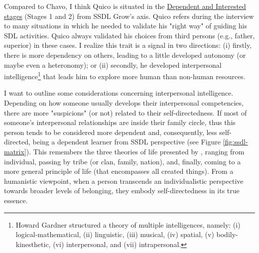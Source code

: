 Compared to Chavo, I think Quico is situated in the \underline{Dependent and Interested stages} (Stages 1 and 2) from \gls{SSDL} Grow's axis. Quico refers during the interview to many situations in which he needed to validate his "right way" of guiding his \gls{SDL} activities. Quico always validated his choices from third persons (e.g., father, superior) in these cases. I realize this trait is a signal in two directions: (i) firstly, there is more dependency on others, leading to a little developed autonomy (or maybe even a heteronomy); or (ii) secondly, he developed interpersonal intelligence\footnote{Howard Gardner \cite[p.~4]{gardner:1989} structured a theory of multiple intelligences, namely: (i) logical-mathematical, (ii) linguistic, (iii) musical, (iv) spatial, (v) bodily-kinesthetic, (vi) interpersonal, and (vii) intrapersonal.} that leads him to explore more human than non-human resources.

I want to outline some considerations concerning interpersonal intelligence. Depending on how someone usually develops their interpersonal competencies, there are more "suspicions" (or not) related to their self-directedness. If most of someone's interpersonal relationships are inside their family circle, thus this person tends to be considered more dependent and, consequently, less self-directed, being a dependent learner from \gls{SSDL} perspective (see Figure \ref{fig:ssdl-matrix}). This remembers the three theories of life presented by , ranging from individual, passing by tribe (or clan, family, nation), and, finally, coming to a more general principle of life (that encompasses all created things). From a humanistic viewpoint, when a person transcends an individualistic perspective towards broader levels of belonging, they embody self-directedness in its true essence.